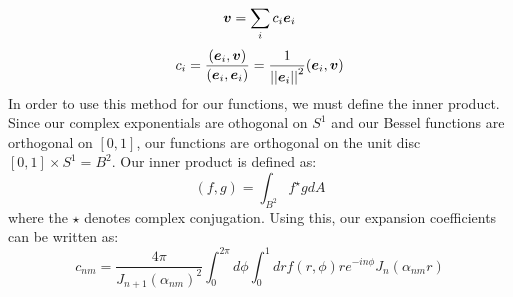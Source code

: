 \documentclass{paper}
\begin{document}
\begin{equation}\bm{v}=\sum_{i} c_i \bm{e}_i\end{equation} 
\begin{equation}c_i=\frac{(\bm{e}_i,\bm{v})}{(\bm{e}_i,\bm{e}_i)}=\frac{1}{\left|\left| \bm{e}_i\right|\right|^2}(\bm{e}_i,\bm{v})\end{equation}
In order to use this method for our functions, we must define the inner product. Since our complex exponentials are othogonal on $S^1$ and our Bessel functions are orthogonal on $[0,1]$, our functions are orthogonal on the unit disc $[0,1]\times S^1=B^2$. Our inner product is defined as:
\begin{equation}(f,g)=\int_{B^2} f^\star g dA\end{equation}
where the $\star$ denotes complex conjugation. Using this, our expansion coefficients can be written as:
\begin{equation}
    \boxed{
        c_{nm}=\frac{4\pi}{J_{n+1}(\alpha_{nm})^2}\int_0^{2\pi} d\phi \int_0^1 dr f(r,\phi) r e^{-in\phi} J_n(\alpha_{nm}r)
    }
\end{equation}
\end{document}
